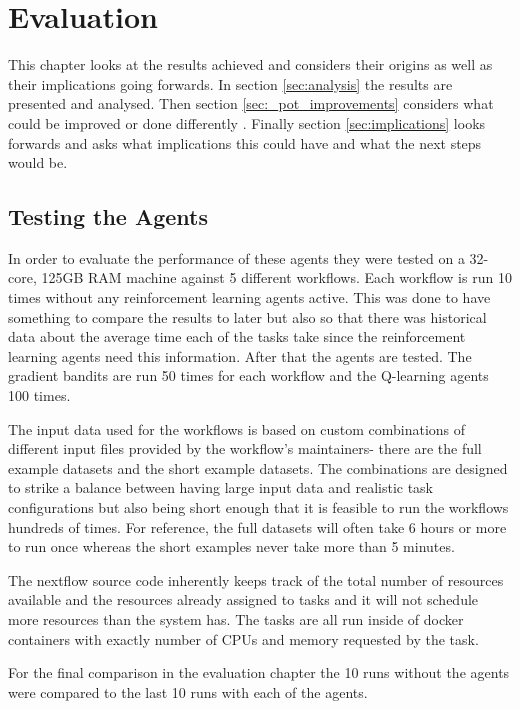 
\cleardoublepage
\chapter{Evaluation}
\label{cha:evaluation}

This chapter looks at the results achieved and considers their origins as well as their implications going forwards. In section \ref{sec:analysis} the results are presented and analysed. Then  section \ref{sec:_pot_improvements} considers what could be improved or done differently . Finally section \ref{sec:implications} looks forwards and asks what implications this could have and what the next steps would be.


\section{Testing the Agents}
\label{sec:testing}

In order to evaluate the performance of these agents they were tested on a 32-core, 125GB RAM machine against 5 different workflows. Each workflow is run 10 times without any reinforcement learning agents active. This was done to have something to compare the results to later but also so that there was historical data about the average time each of the tasks take since the reinforcement learning agents need this information. After that the agents are tested. The gradient bandits are run 50 times for each workflow and the Q-learning agents 100 times.

The input data used for the workflows is based on custom combinations of different input files provided by the workflow's maintainers- there are the full example datasets and the short example datasets. The combinations are designed to strike a balance between having large input data and realistic task configurations but also being short enough that it is feasible to run the workflows hundreds of times. For reference, the full datasets will often take 6 hours or more to run once whereas the short examples never take more than 5 minutes. 

The nextflow source code inherently keeps track of the total number of resources available and the resources already assigned to tasks and it will not schedule more resources than the system has. The tasks are all run inside of docker containers with exactly number of CPUs and memory requested by the task. 

For the final comparison in the evaluation chapter the 10 runs without the agents were compared to the last 10 runs with each of the agents.



